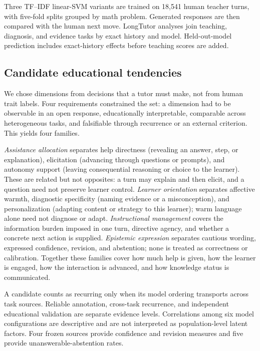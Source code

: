 \documentclass[11pt]{article}
\begin{document}
Three TF--IDF linear-SVM variants are trained on 18,541 human teacher turns, with
five-fold splits grouped by math problem. Generated responses are then compared
with the human next move. LongTutor analyses join teaching, diagnosis, and
evidence tasks by exact history and model. Held-out-model prediction includes
exact-history effects before teaching scores are added.

\subsection{Candidate educational tendencies}

We chose dimensions from decisions that a tutor must make, not from human trait
labels. Four requirements constrained the set: a dimension had to be observable
in an open response, educationally interpretable, comparable across heterogeneous
tasks, and falsifiable through recurrence or an external criterion. This yields
four families.

\emph{Assistance allocation} separates help directness (revealing an answer,
step, or explanation), elicitation (advancing through questions or prompts), and
autonomy support (leaving consequential reasoning or choice to the learner).
These are related but not opposites: a turn may explain and then elicit, and a
question need not preserve learner control. \emph{Learner orientation} separates
affective warmth, diagnostic specificity (naming evidence or a misconception),
and personalization (adapting content or strategy to this learner); warm language
alone need not diagnose or adapt. \emph{Instructional management} covers the
information burden imposed in one turn, directive agency, and whether a concrete
next action is supplied. \emph{Epistemic expression} separates cautious wording,
expressed confidence, revision, and abstention; none is treated as correctness or
calibration. Together these families cover how much help is given, how the learner
is engaged, how the interaction is advanced, and how knowledge status is
communicated.

A candidate counts as recurring only when its model ordering transports across
task sources. Reliable annotation, cross-task recurrence, and independent
educational validation are separate evidence levels. Correlations among six
model configurations are descriptive and are not interpreted as population-level
latent factors. Four frozen sources provide confidence and revision measures and
five provide unanswerable-abstention rates.
\end{document}
